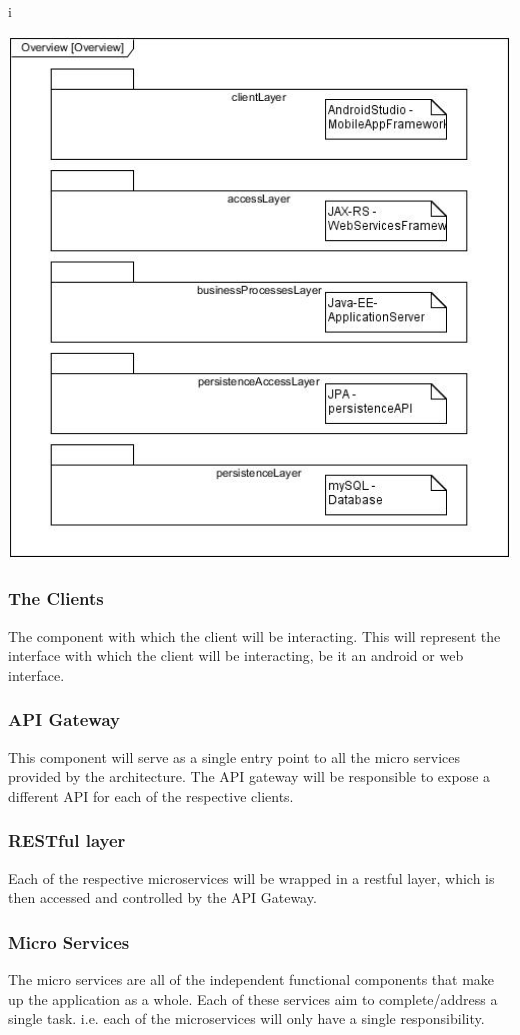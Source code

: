i\documentclass[a4paper,12pt]{article}
\begin{document}
	\includegraphics[width=1\textwidth]{./Pictures/UML/architectureOverview.jpg}\\[1.5cm]
	
	
	\subsubsection{The Clients}
	The component with which the client will be interacting. This will represent the interface with which the client will be interacting, be it an android or web interface.
	\subsubsection{API Gateway}
	This component will serve as a single entry point to all the micro services provided by the architecture. The API gateway will be responsible to expose a different API for each of the respective clients. 
	\subsubsection{RESTful layer}
	Each of the respective microservices will be wrapped in a restful layer, which is then accessed and controlled by the API Gateway. 
	\subsubsection{Micro Services}
	The micro services are all of the independent functional components that make up the application as a whole. Each of these services aim to complete/address a single task. i.e. each of the microservices will only have a single responsibility. 
\end{document}
